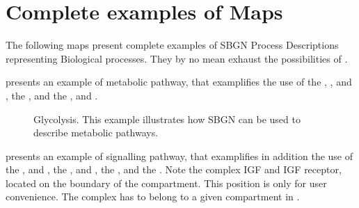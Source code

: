 \chapter{Complete examples of \PD Maps}

The following maps present complete examples of SBGN Process Descriptions representing Biological processes. They by no mean exhaust the possibilities of  \SBGNPDLone.

 presents an example of metabolic pathway, that examplifies the use of the  , , and , the  , and the  ,  and .

\begin{figure}[htb]
\begin{center}
\caption{Glycolysis. This example illustrates how SBGN can be used to describe metabolic pathways.}\label{fig:glycolysis}
\end{center}
\end{figure}

 presents an example of signalling pathway, that examplifies in addition the use of the  , and , the  ,  and , the  , and the  . Note the complex IGF and IGF receptor, located on the boundary of the compartment. This position is only for user convenience. The complex has to belong to a given compartment in \SBGNPDLone.

